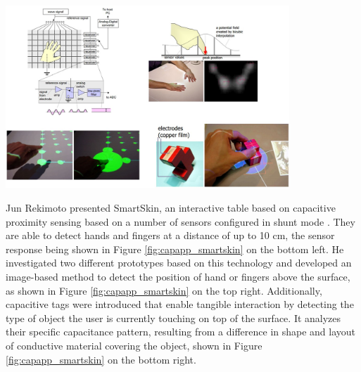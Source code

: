 \begin{minipage}{\linewidth}
\centering
\includegraphics[width=0.8\textwidth]{images/capapp_smartskin}
\label{fig:capapp_smartskin}
\end{minipage}

Jun Rekimoto presented SmartSkin, an interactive table based on capacitive proximity sensing based on a number of sensors configured in shunt mode \cite{rekimoto2002smartskin}. They are able to detect hands and fingers at a distance of up to 10 cm, the sensor response being shown in Figure \ref{fig:capapp_smartskin} on the bottom left. He investigated two different prototypes based on this technology and developed an image-based method to detect the position of hand or fingers above the surface, as shown in Figure \ref{fig:capapp_smartskin} on the top right. Additionally, capacitive tags were introduced that enable tangible interaction by detecting the type of object the user is currently touching on top of the surface. It analyzes their specific capacitance pattern, resulting from a difference in shape and layout of conductive material covering the object, shown in Figure \ref{fig:capapp_smartskin} on the bottom right.

